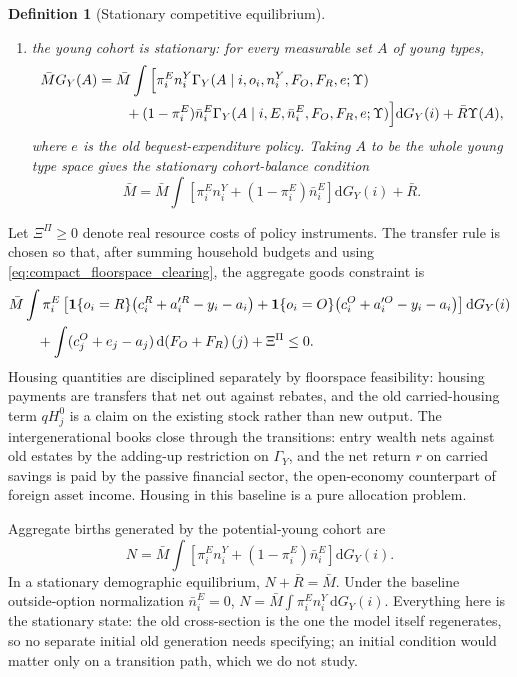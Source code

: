 \documentclass[11pt]{article}
\newtheorem{definition}{Definition}
\newcommand{\dd}{\mathrm d}
\newcommand{\1}{\mathbf 1}
\begin{document}
\begin{definition}[Stationary competitive equilibrium]
\begin{enumerate}
\begin{equation}
\dd G_Y(i),
\label{eq:compact_old_stationarity}
\end{equation}
and the old-renter measure satisfies the same condition with $\Gamma_R$ and $\1\{o_i=R\}$;
\item the young cohort is stationary: for every measurable set $A$ of young types,
\begin{align}
\bar M G_Y(A)
&=
\bar M\int
\Big[
\pi_i^E n_i^{Y}
\Gamma_Y(A\mid i,o_i,n_i^{Y},F_O,F_R,e;\Upsilon)
\notag\\
&\qquad
+(1-\pi_i^E)\bar n_i^E
\Gamma_Y(A\mid i,E,\bar n_i^E,F_O,F_R,e;\Upsilon)
\Big]\dd G_Y(i)
+
\bar R\Upsilon(A),
\label{eq:compact_young_stationarity}
\end{align}
where $e$ is the old bequest-expenditure policy. Taking $A$ to be the whole young type space gives the stationary cohort-balance condition
\begin{equation}
\bar M
=
\bar M\int
\left[
\pi_i^E n_i^{Y}+(1-\pi_i^E)\bar n_i^E
\right]\dd G_Y(i)
+
\bar R.
\label{eq:compact_cohort_stationarity}
\end{equation}
\end{enumerate}
\end{definition}

Let $\Xi^\Pi\ge0$ denote real resource costs of policy instruments. The transfer rule is chosen so that, after summing household budgets and using \eqref{eq:compact_floorspace_clearing}, the aggregate goods constraint is
\begin{align*}
&\bar M\int
\pi_i^E
\left[
\1\{o_i=R\}\big(c_i^R+a_i^{\prime R}-y_i-a_i\big)
+
\1\{o_i=O\}\big(c_i^O+a_i^{\prime O}-y_i-a_i\big)
\right]\dd G_Y(i)
\notag\\
&\qquad
+
\int(c_j^O+e_j-a_j)\,\dd\!\left(F_O+F_R\right)(j)
+\Xi^\Pi
\le0.
\end{align*}
Housing quantities are disciplined separately by floorspace feasibility: housing payments are transfers that net out against rebates, and the old carried-housing term $q H_j^0$ is a claim on the existing stock rather than new output. The intergenerational books close through the transitions: entry wealth nets against old estates by the adding-up restriction on $\Gamma_Y$, and the net return $r$ on carried savings is paid by the passive financial sector, the open-economy counterpart of foreign asset income. Housing in this baseline is a pure allocation problem.

Aggregate births generated by the potential-young cohort are
\[
N
=
\bar M\int
\left[
\pi_i^E n_i^Y+(1-\pi_i^E)\bar n_i^E
\right]
\dd G_Y(i).
\]
In a stationary demographic equilibrium, $N+\bar R=\bar M$. Under the baseline outside-option normalization $\bar n_i^E=0$, $N=\bar M\int\pi_i^E n_i^Y\,\dd G_Y(i)$. Everything here is the stationary state: the old cross-section is the one the model itself regenerates, so no separate initial old generation needs specifying; an initial condition would matter only on a transition path, which we do not study.
\end{document}
